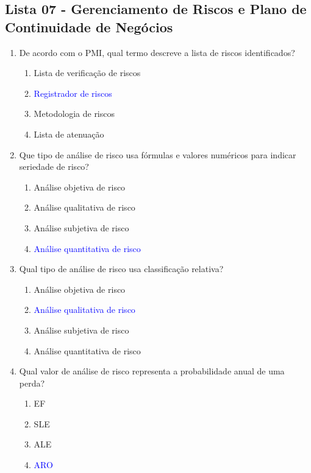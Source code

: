 \documentclass{report}
\begin{document}
	
	
	
	
	
	
	
	
	
	\subsection{Lista 07 - Gerenciamento de Riscos e Plano de Continuidade de Negócios}
	
	\begin{enumerate}
		\item De acordo com o PMI, qual termo descreve a lista de riscos identificados?
		\begin{enumerate}[label=(\alph*)]
			\item Lista de verificação de riscos
			\item \textcolor{blue}{Registrador de riscos}
			\item Metodologia de riscos
			\item Lista de atenuação
		\end{enumerate}
		
		\item Que tipo de análise de risco usa fórmulas e valores numéricos para indicar seriedade de risco?
		\begin{enumerate}[label=(\alph*)]
			\item Análise objetiva de risco
			\item Análise qualitativa de risco
			\item Análise subjetiva de risco
			\item \textcolor{blue}{Análise quantitativa de risco}
		\end{enumerate}
		
		\item Qual tipo de análise de risco usa classificação relativa?
		\begin{enumerate}[label=(\alph*)]
			\item Análise objetiva de risco
			\item \textcolor{blue}{Análise qualitativa de risco}
			\item Análise subjetiva de risco
			\item Análise quantitativa de risco
		\end{enumerate}
		
		\item Qual valor de análise de risco representa a probabilidade anual de uma perda?
		\begin{enumerate}[label=(\alph*)]
			\item EF
			\item SLE
			\item ALE
			\item \textcolor{blue}{ARO}
		\end{enumerate}
		

\end{enumerate}
\end{document}
